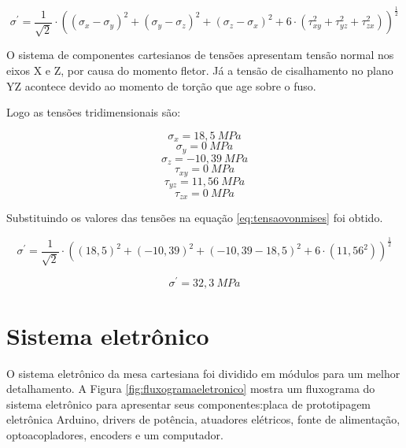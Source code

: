 \begin{equation}\label{eq:tensaovonmises}
    \sigma^{'} = \frac{1}{\sqrt{2}} \cdot ((\sigma_{x} - \sigma_{y})^{2} + (\sigma_{y} - \sigma_{z})^{2} + (\sigma_{z} - \sigma_{x})^{2} + 6 \cdot (\tau_{xy}^{2} + \tau_{yz}^{2} + \tau_{zx}^{2}))^{\frac{1}{2}}
\end{equation}

O sistema de componentes cartesianos de tensões apresentam tensão normal nos eixos X e Z, 
por causa do momento fletor. Já a tensão de cisalhamento no plano YZ acontece 
devido ao momento de torção que age sobre o fuso.

Logo as tensões tridimensionais são:

$$\sigma_{x} = 18,5~MPa$$
$$\sigma_{y} = 0~MPa$$
$$\sigma_{z} = -10,39~MPa$$
$$\tau_{xy} = 0~MPa$$
$$\tau_{yz} = 11,56~MPa$$
$$\tau_{zx} = 0~MPa$$

Substituindo os valores das tensões na equação \ref{eq:tensaovonmises} foi obtido.

$$\sigma^{'} = \frac{1}{\sqrt{2}} \cdot ((18,5)^{2} + (-10,39)^{2} + (-10,39 - 18,5)^{2} + 6 \cdot (11,56^{2}))^{\frac{1}{2}}$$

$$\sigma^{'} = 32,3~MPa$$

\section{Sistema eletrônico}\label{sec:metsisele}

O sistema eletrônico da mesa cartesiana foi dividido em módulos para um melhor detalhamento.
A Figura \ref{fig:fluxogramaeletronico} mostra um fluxograma do sistema eletrônico para apresentar 
seus componentes:placa de prototipagem eletrônica Arduino, drivers de potência, atuadores elétricos, 
fonte de alimentação, optoacopladores, encoders e um computador.

